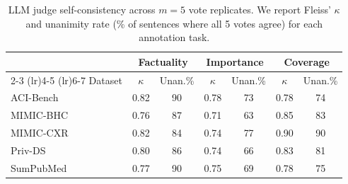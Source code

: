\begin{table}[h]
\centering
\small
\caption{LLM judge self-consistency across $m{=}5$ vote replicates. We report Fleiss' $\kappa$ and unanimity rate (\% of sentences where all 5 votes agree) for each annotation task.}
\label{tab:judge-variance}
\begin{tabular}{l cc cc cc}
\toprule
 & \multicolumn{2}{c}{Factuality} & \multicolumn{2}{c}{Importance} & \multicolumn{2}{c}{Coverage} \\
\cmidrule(lr){2-3} \cmidrule(lr){4-5} \cmidrule(lr){6-7}
Dataset & $\kappa$ & Unan.\% & $\kappa$ & Unan.\% & $\kappa$ & Unan.\% \\
\midrule
  ACI-Bench & 0.82 & 90 & 0.78 & 73 & 0.78 & 74 \\
  MIMIC-BHC & 0.76 & 87 & 0.71 & 63 & 0.85 & 83 \\
  MIMIC-CXR & 0.82 & 84 & 0.74 & 77 & 0.90 & 90 \\
  Priv-DS & 0.80 & 86 & 0.74 & 66 & 0.83 & 81 \\
  SumPubMed & 0.77 & 90 & 0.75 & 69 & 0.78 & 75 \\
\bottomrule
\end{tabular}
\end{table}